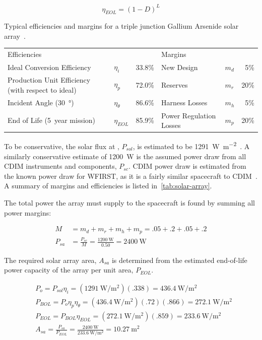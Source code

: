 \documentclass{ws-jai}
\begin{document}
\begin{equation}
  \eta_{EOL} = {(1-D)}^L
\end{equation}

\begin{wstable}[!ht]
  \centering
  \caption{Typical efficiencies and margins for a triple junction Gallium Arsenide solar array~\cite{smad2015}.
\label{tab:solar-array}
  }
  \begin{tabular}{@{}llrllr@{}}\toprule
    Efficiencies &&  & Margins & & \\ \cmidrule(r){1-3} \cmidrule(l){4-6}
    Ideal Conversion Efficiency & $\eta_{i}$ & 33.8\% & New Design & $m_d$ & 5\%  \\
    Production Unit Efficiency (with respect to ideal) & $\eta_{p}$  & 72.0\% & Reserves & $m_r$ & 20\% \\
    Incident Angle (\SI{30}{\degree}) & $\eta_{\theta}$ & 86.6\% & Harness Losses & $m_h$ &5\% \\
    End of Life (\SI{5}{year} mission) & $\eta_{EOL}$ & 85.9\% & Power Regulation Losses &  $m_p$ & 20\% \\ \bottomrule
  \end{tabular}
\end{wstable}

To be conservative, the solar flux at \Ltwo, $P_{sol}$, is estimated to be \SI{1291}{\watt\per\meter\squared}~\cite{evans2002natural}.
A similarly conservative estimate of \SI{1200}{\watt} is the assumed power draw from all CDIM instruments and components, $P_{sc}$.
CDIM power draw is estimated from the known power draw for WFIRST, as it is a fairly similar spacecraft to CDIM~\cite{wfirstFinal2012}.
A summary of margins and efficiencies is listed in~\autoref{tab:solar-array}.

The total power the array must supply to the spacecraft is found by summing all power margins:

\begin{align}
  M &= m_d + m_r + m_h + m_p = .05 +.2 + .05 + .2 \\
  P_{sa} &= \frac{P_{sc}}{M} = \frac{\SI{1200}{\watt}}{0.50} = \SI{2400}{\watt}
\end{align}

The required solar array area, $A_{sa}$ is determined from the estimated end-of-life power capacity of the array per unit area, $P_{EOL}$.

\begin{align}\label{eq:array-area}
  &P_{o} = P_{sol}\eta_i = (\SI{1291}{\watt\per\meter\squared})(.338) = \SI{436.4}{\watt\per\meter\squared} \\
  &P_{BOL} = P_o\eta_p\eta_{\theta} = (\SI{436.4}{\watt\per\meter\squared})(.72)(.866) = \SI{272.1}{\watt\per\meter\squared} \\
  &P_{EOL} = P_{BOL}\eta_{EOL} = (\SI{272.1}{\watt\per\meter\squared})(.859) = \SI{233.6}{\watt\per\meter\squared} \\
  &A_{sa} = \frac{P_{sa}}{P_{EOL}} = \frac{\SI{2400}{\watt}}{\SI{233.6}{\watt\per\meter\squared}} = \SI{10.27}{\meter\squared}
\end{align}
\end{document}
